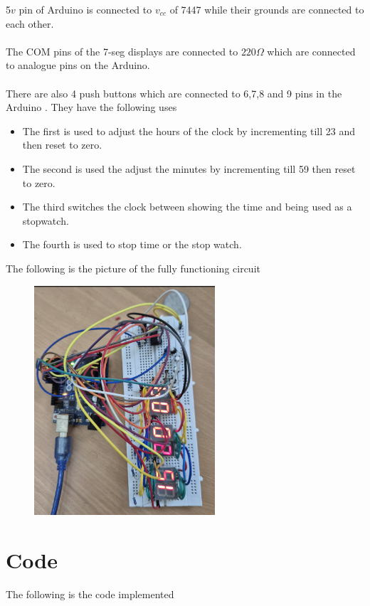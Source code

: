 \documentclass[a4paper,12pt]{article}
\begin{document}
5$v$ pin of Arduino is connected to $v_{cc}$ of 7447 while their grounds are connected to each other.\\
\\
The COM pins of the 7-seg displays are connected to $220 \Omega$ which are connected to analogue pins on the Arduino.\\
\\
There are also 4 push buttons which are connected to 6,7,8 and 9 pins in the Arduino . They have the following uses
\begin{itemize}
    \item The first is used to adjust the hours of the clock by incrementing till 23 and then reset to zero.
    \item The second is used the adjust the minutes by incrementing till 59 then reset to zero.
    \item The third switches the clock between showing the time and being used as a stopwatch.
    \item The fourth is used to stop time or the stop watch.
\end{itemize}
The following is the picture of the fully functioning circuit
\begin{figure}[h!] %
  \centering
  \includegraphics[width=0.6\textwidth]{figs/circuit.png}
\end{figure}

 \section{Code}
The following is the code implemented
\end{document}
